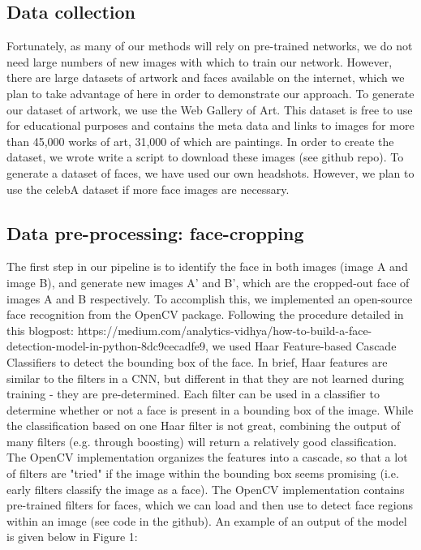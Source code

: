 \documentclass{pnastwo2}
\begin{document}
\begin{article}
\subsection{Data collection}

Fortunately, as many of our methods will rely on pre-trained networks, we do not need large numbers of new images with which to train our network. However, there are large datasets of artwork and faces available on the internet, which we plan to take advantage of here in order to demonstrate our approach. To generate our dataset of artwork, we use the Web Gallery of Art. This dataset is free to use for educational purposes and contains the meta data and links to images for more than 45,000 works of art, 31,000 of which are paintings. In order to create the dataset, we wrote write a script to download these images (see github repo).  To generate a dataset of faces, we have used our own headshots. However, we plan to use the celebA dataset if more face images are necessary.

\subsection{Data pre-processing: face-cropping}

The first step in our pipeline is to identify the face in both images (image A and image B), and generate new images A' and B', which are the cropped-out face of images A and B respectively. To accomplish this, we implemented an open-source face recognition from the OpenCV package. Following the procedure detailed in this blogpost: https://medium.com/analytics-vidhya/how-to-build-a-face-detection-model-in-python-8dc9cecadfe9, we used Haar Feature-based Cascade Classifiers to detect the bounding box of the face. In brief, Haar features are similar to the filters in a CNN, but different in that they are not learned during training - they are pre-determined. Each filter can be used in a classifier to determine whether or not a face is present in a bounding box of the image. While the classification based on one Haar filter is not great, combining the output of many filters (e.g. through boosting) will return a relatively good classification. The OpenCV implementation organizes the features into a cascade, so that a lot of filters are "tried" if the image within the bounding box seems promising (i.e. early filters classify the image as a face). The OpenCV implementation contains pre-trained filters for faces, which we can load and then use to detect face regions within an image (see code in the github). An example of an output of the model is given below in Figure 1:


\end{article}
\end{document}
